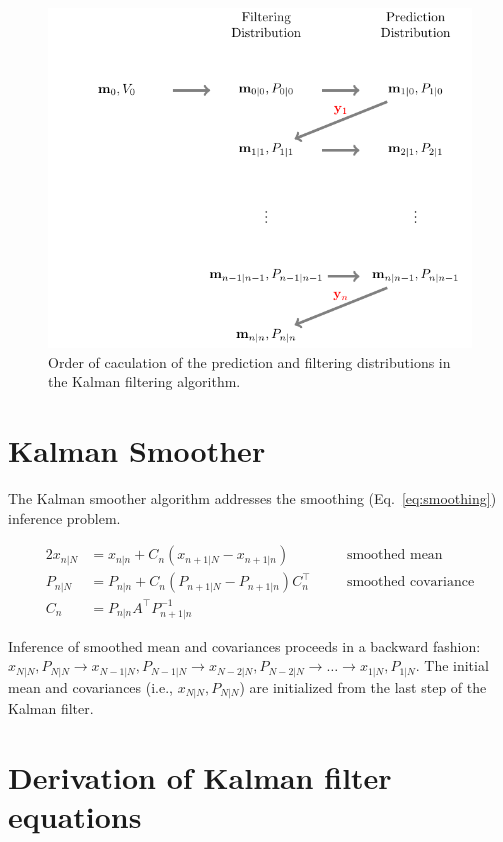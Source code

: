 \documentclass[12pt]{article}
\begin{document}
\begin{figure}[h]
\begin{center}
    \includegraphics[width=5in]{figures/kfAlternations.pdf}
    \caption{Order of caculation of the prediction and filtering distributions
    in the Kalman filtering algorithm.}
    \label{fig:kfAlternations.}
\end{center}
\end{figure}

\section{Kalman Smoother}

The Kalman smoother algorithm addresses the smoothing (Eq.~\ref{eq:smoothing})
inference problem.

\begin{alignat*}{2}
    x_{n|N}&=x_{n|n}+C_n(x_{n+1|N}-x_{n+1|n})\quad&&\text{smoothed mean}\\
    P_{n|N}&=P_{n|n}+C_n(P_{n+1|N}-P_{n+1|n})C_n^\intercal\quad&&\text{smoothed covariance}\\
    C_n&=P_{n|n}A^\intercal P_{n+1|n}^{-1}&&
\end{alignat*}

Inference of smoothed mean and covariances proceeds in a backward fashion:
$x_{N|N}, P_{N|N}\rightarrow x_{N-1|N}, P_{N-1|N}\rightarrow x_{N-2|N},
P_{N-2|N}\rightarrow\ldots\rightarrow  x_{1|N}, P_{1|N}$. The initial mean and
covariances (i.e., $x_{N|N}, P_{N|N}$) are initialized from the last step of
the Kalman filter.

\section{Derivation of Kalman filter equations}
\end{document}
